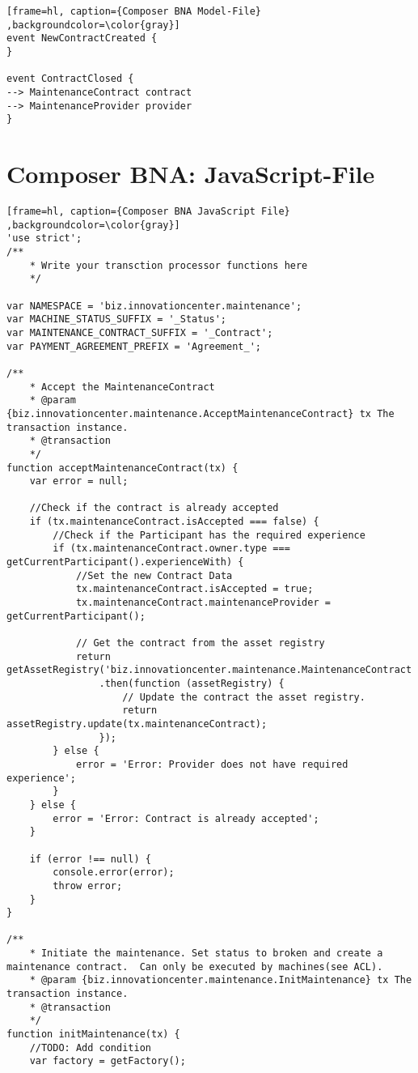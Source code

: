 \begin{appendices}
\begin{lstlisting}[frame=hl, caption={Composer BNA Model-File} ,backgroundcolor=\color{gray}]
event NewContractCreated {
}

event ContractClosed {
--> MaintenanceContract contract
--> MaintenanceProvider provider
}
\end{lstlisting}

\chapter{Composer BNA: JavaScript-File}
\label{append:javascript-file}

\begin{lstlisting}[frame=hl, caption={Composer BNA JavaScript File} ,backgroundcolor=\color{gray}]
'use strict';
/**
    * Write your transction processor functions here
    */

var NAMESPACE = 'biz.innovationcenter.maintenance';
var MACHINE_STATUS_SUFFIX = '_Status';
var MAINTENANCE_CONTRACT_SUFFIX = '_Contract';
var PAYMENT_AGREEMENT_PREFIX = 'Agreement_';

/**
    * Accept the MaintenanceContract
    * @param {biz.innovationcenter.maintenance.AcceptMaintenanceContract} tx The transaction instance.
    * @transaction
    */
function acceptMaintenanceContract(tx) {
    var error = null;

    //Check if the contract is already accepted
    if (tx.maintenanceContract.isAccepted === false) {
        //Check if the Participant has the required experience
        if (tx.maintenanceContract.owner.type === getCurrentParticipant().experienceWith) {
            //Set the new Contract Data
            tx.maintenanceContract.isAccepted = true;
            tx.maintenanceContract.maintenanceProvider = getCurrentParticipant();

            // Get the contract from the asset registry
            return getAssetRegistry('biz.innovationcenter.maintenance.MaintenanceContract')
                .then(function (assetRegistry) {
                    // Update the contract the asset registry.
                    return assetRegistry.update(tx.maintenanceContract);
                });
        } else {
            error = 'Error: Provider does not have required experience';
        }
    } else {
        error = 'Error: Contract is already accepted';
    }

    if (error !== null) {
        console.error(error);
        throw error;
    }
}

/**
    * Initiate the maintenance. Set status to broken and create a maintenance contract.  Can only be executed by machines(see ACL).
    * @param {biz.innovationcenter.maintenance.InitMaintenance} tx The transaction instance.
    * @transaction
    */
function initMaintenance(tx) {
    //TODO: Add condition
    var factory = getFactory();


\end{lstlisting}
\end{appendices}
